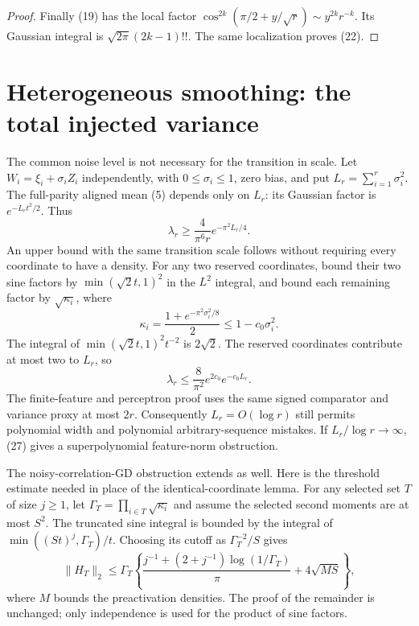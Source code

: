 \documentclass[11pt]{article}
\begin{document}
\begin{proof}
Finally (19) has the local factor
$\cos^{2k}(\pi/2+y/\sqrt r)\sim y^{2k}r^{-k}$.
Its Gaussian integral is
$\sqrt{2\pi}(2k-1)!!$. The same localization proves (22).
\end{proof}

\section{Heterogeneous smoothing: the total injected variance}
The common noise level is not necessary for the transition in scale.
Let $W_i=\xi_i+\sigma_i Z_i$ independently, with
$0\le\sigma_i\le1$, zero bias, and put
$L_r=\sum_{i=1}^r\sigma_i^2$. The full-parity aligned mean (5)
depends only on $L_r$: its Gaussian factor is $e^{-L_rt^2/2}$.
Thus
\[
 \lambda_r\ge\frac4{\pi^6r}e^{-\pi^2L_r/4}.
 \tag{26}
\]
An upper bound with the same transition scale follows without requiring
every coordinate to have a density. For any two reserved coordinates,
bound their two sine factors by $\min(\sqrt2t,1)^2$ in the $L^2$
integral, and bound each remaining factor by $\sqrt{\kappa_i}$, where
\[
 \kappa_i=\frac{1+e^{-\pi^2\sigma_i^2/8}}2
                                      \le1-c_0\sigma_i^2.
\]
The integral of $\min(\sqrt2t,1)^2t^{-2}$ is $2\sqrt2$.
The reserved coordinates contribute at most two to $L_r$, so
\[
 \lambda_r\le\frac8{\pi^2}e^{2c_0}e^{-c_0L_r}.
 \tag{27}
\]
The finite-feature and perceptron proof uses the same signed comparator
and variance proxy at most $2r$. Consequently $L_r=O(\log r)$
still permits polynomial width and polynomial arbitrary-sequence
mistakes. If $L_r/\log r\to\infty$, (27) gives a superpolynomial
feature-norm obstruction.

The noisy-correlation-GD obstruction extends as well. Here is the
threshold estimate needed in place of the identical-coordinate lemma.
For any selected set $T$ of size $j\ge1$, let
$\Gamma_T=\prod_{i\in T}\sqrt{\kappa_i}$ and assume the selected
second moments are at most $S^2$. The truncated sine integral is bounded
by the integral of $\min((St)^j,\Gamma_T)/t$.
Choosing its cutoff as $\Gamma_T^{-2}/S$ gives
\[
 \|H_T\|_2\le\Gamma_T
 \left\{\frac{j^{-1}+(2+j^{-1})\log(1/\Gamma_T)}\pi
                                      +4\sqrt{MS}\right\},
 \tag{28}
\]
where $M$ bounds the preactivation densities. The proof of the remainder
is unchanged; only independence is used for the product of sine factors.
\end{document}
